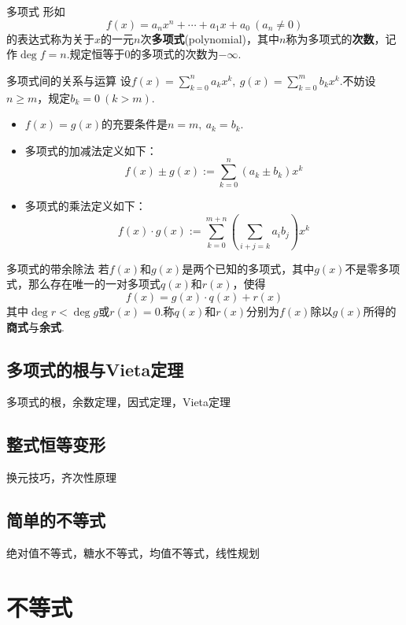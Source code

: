 \documentclass[lang=cn, zihao=4.5]{elegantbook}
\newcommand{\ssb}[1]{\left( #1 \right)}
\begin{document}
\begin{definition}{多项式}
	形如$$f(x) = a_nx^n + \cdots + a_1x + a_0~(a_n \neq 0)$$的表达式称为关于$x$的一元$n$次\textbf{多项式}(polynomial)，其中$n$称为多项式的\textbf{次数}，记作$\deg f = n$.规定恒等于$0$的多项式的次数为$-\infty$.
\end{definition}

\begin{definition}{多项式间的关系与运算}
	设$f(x) = \sum_{k=0}^{n}a_kx^k,~g(x) = \sum_{k=0}^{m}b_kx^k$.不妨设$n \geq m$，规定$b_k=0~(k > m)$.
	\begin{itemize}
		\item $f(x)=g(x)$的充要条件是$n=m,~a_k=b_k$.
		\item 多项式的加减法定义如下：$$f(x) \pm g(x) := \sum_{k=0}^{n} (a_k \pm b_k)x^{k}$$
		\item 多项式的乘法定义如下：$$f(x) \cdot g(x) := \sum_{k=0}^{m+n} \ssb{\sum_{i+j=k}a_ib_j}x^k$$
	\end{itemize}
\end{definition}

\begin{proposition}{多项式的带余除法}
	若$f(x)$和$g(x)$是两个已知的多项式，其中$g(x)$不是零多项式，那么存在唯一的一对多项式$q(x)$和$r(x)$，使得$$f(x) = g(x) \cdot q(x) + r(x)$$其中$\deg r < \deg g$或$r(x)=0$.称$q(x)$和$r(x)$分别为$f(x)$除以$g(x)$所得的\textbf{商式}与\textbf{余式}.
\end{proposition}

\section{多项式的根与Vieta定理}

多项式的根，余数定理，因式定理，Vieta定理

\section{整式恒等变形}

换元技巧，齐次性原理

\section{简单的不等式}

绝对值不等式，糖水不等式，均值不等式，线性规划

\chapter{不等式}
\end{document}
